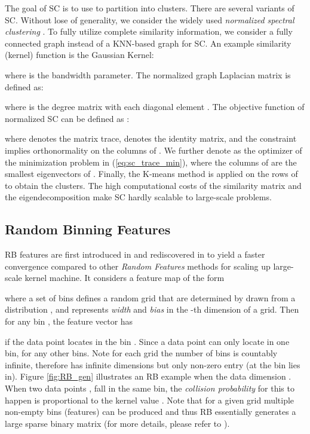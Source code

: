 \documentclass[sigconf]{acmart}
\newcommand{\1}{\boldsymbol{1}}
\newcommand{\0}{\boldsymbol{0}}
\begin{document}
The goal of SC is to use  to partition  into  clusters. There are several variants of SC. Without lose of generality, we consider the widely used \emph{normalized spectral clustering} \cite{ng2002spectral}. To fully utilize complete similarity information, we consider a fully connected graph instead of a KNN-based graph for SC. An example similarity (kernel) function is the Gaussian Kernel:

where  is the bandwidth parameter. The normalized graph Laplacian matrix  is defined as: 

where  is the degree matrix with each diagonal element . The objective function of normalized SC can be defined as \cite{shi2000normalized}:

where  denotes the matrix trace,
 denotes the identity matrix, and the constraint  implies orthonormality on the columns of . We further denote  as the optimizer of the minimization problem in (\ref{eq:sc_trace_min}), where the columns of  are the  smallest eigenvectors of . Finally, the K-means method is applied on the rows of  to obtain the clusters. The high computational costs of the similarity matrix  and the eigendecomposition  make SC   hardly scalable to large-scale problems. 

\subsection{Random Binning Features}
RB features are first introduced in \cite{rahimi2008random} and rediscovered in \cite{wu2016revisiting} to yield a faster convergence compared to other \emph{Random Features} methods for scaling up large-scale kernel machine. It considers a feature map of the form

where a set of bins  defines a random grid that are determined by  drawn from a distribution , and  represents \emph{width} and \emph{bias} in the -th dimension of a grid. Then for any bin , the feature vector  has
 
if the data point  locates in the bin . Since a data point can only locate in one bin,  for any other bins. 
Note for each grid  the number of bins  is countably infinite, therefore  has infinite dimensions but only  non-zero entry (at the bin  lies in). 
Figure \ref{fig:RB_gen} illustrates an RB example when the data dimension .
When two data points ,  fall in the same bin, the \emph{collision probability} for this to happen is proportional to the kernel value . Note that for a given grid multiple non-empty bins (features) can be produced and thus RB essentially generates a large sparse binary matrix (for more details, please refer to \cite{wu2016revisiting}). 
\end{document}
